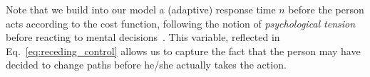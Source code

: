 \documentclass[conference]{IEEEtran}
\begin{document}
Note that we build into our model a (adaptive) response 
time $n$ before the person acts according to the cost function, following the notion of
\emph{psychological tension} before reacting to mental 
decisions~\cite{helbing1995social}.  This variable, reflected in 
Eq.~\ref{eq:receding_control} allows us to capture the fact that the person may 
have decided to change paths before he/she actually takes the action.



\end{document}
